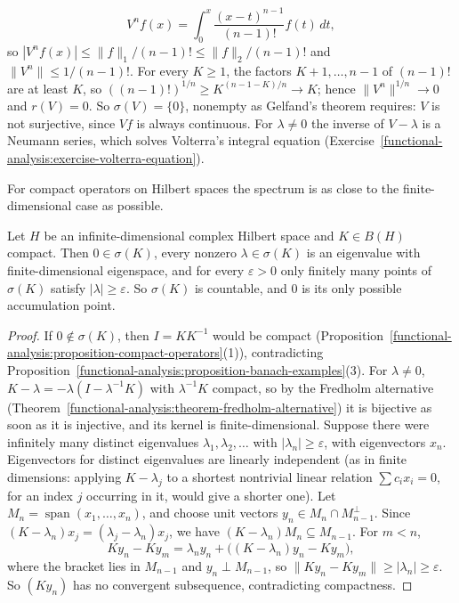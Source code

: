 \begin{example}
\begin{enumerate}
\[
V^nf(x) = \int_0^x\frac{(x - t)^{n-1}}{(n - 1)!}f(t)\,dt,
\]
so $|V^nf(x)| \leq \|f\|_1/(n - 1)! \leq \|f\|_2/(n - 1)!$ and $\|V^n\| \leq 1/(n - 1)!$. For every $K \geq 1$, the factors $K + 1, \ldots, n - 1$ of $(n - 1)!$ are at least $K$, so
$((n - 1)!)^{1/n} \geq K^{(n - 1 - K)/n} \to K$; hence $\|V^n\|^{1/n} \to 0$ and $r(V) = 0$. So $\sigma(V) = \{0\}$, nonempty as Gelfand's theorem requires: $V$ is not surjective, since $Vf$ is always
continuous. For $\lambda \neq 0$ the inverse of $V - \lambda$ is a Neumann series, which solves Volterra's integral equation (Exercise~\ref{functional-analysis:exercise-volterra-equation}).
\end{enumerate}
\end{example}

For compact operators on Hilbert spaces the spectrum is as close to the finite-dimensional case as possible.

\begin{corollary}\label{functional-analysis:corollary-spectrum-compact}
Let $H$ be an infinite-dimensional complex Hilbert space and $K \in B(H)$ compact. Then $0 \in \sigma(K)$, every nonzero $\lambda \in \sigma(K)$ is an eigenvalue with finite-dimensional eigenspace, and for every
$\varepsilon > 0$ only finitely many points of $\sigma(K)$ satisfy $|\lambda| \geq \varepsilon$. So $\sigma(K)$ is countable, and $0$ is its only possible accumulation point.
\end{corollary}

\begin{proof}
If $0 \notin \sigma(K)$, then $I = KK^{-1}$ would be compact (Proposition~\ref{functional-analysis:proposition-compact-operators}(1)), contradicting
Proposition~\ref{functional-analysis:proposition-banach-examples}(3). For $\lambda \neq 0$, $K - \lambda = -\lambda(I - \lambda^{-1}K)$ with $\lambda^{-1}K$ compact, so by the Fredholm alternative
(Theorem~\ref{functional-analysis:theorem-fredholm-alternative}) it is bijective as soon as it is injective, and its kernel is finite-dimensional. Suppose there were infinitely many distinct eigenvalues
$\lambda_1, \lambda_2, \ldots$ with $|\lambda_n| \geq \varepsilon$, with eigenvectors $x_n$. Eigenvectors for distinct eigenvalues are linearly independent (as in finite dimensions: applying $K - \lambda_j$ to a shortest nontrivial linear relation
$\sum c_ix_i = 0$, for an index $j$ occurring in it, would give a shorter one). Let $M_n = \operatorname{span}(x_1, \ldots, x_n)$, and choose unit vectors $y_n \in M_n \cap M_{n-1}^\perp$. Since $(K - \lambda_n)x_j = (\lambda_j - \lambda_n)x_j$,
we have $(K - \lambda_n)M_n \subseteq M_{n-1}$. For $m < n$,
\[
Ky_n - Ky_m = \lambda_ny_n + \bigl((K - \lambda_n)y_n - Ky_m\bigr),
\]
where the bracket lies in $M_{n-1}$ and $y_n \perp M_{n-1}$, so $\|Ky_n - Ky_m\| \geq |\lambda_n| \geq \varepsilon$. So $(Ky_n)$ has no convergent subsequence, contradicting compactness.
\end{proof}

